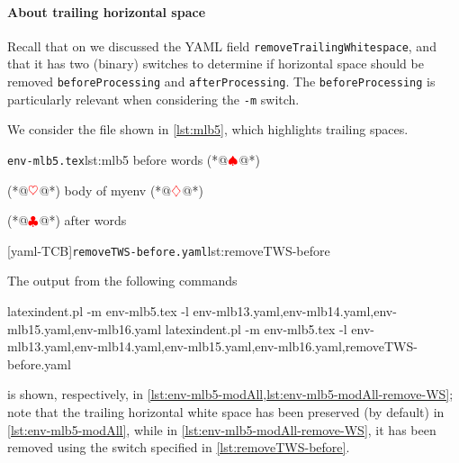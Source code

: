  \paragraph{About trailing horizontal space}
  Recall that on  we discussed the YAML field
  \texttt{removeTrailingWhitespace}, and that it has two (binary) switches to determine if
  horizontal space should be removed \texttt{beforeProcessing} and
  \texttt{afterProcessing}. The \texttt{beforeProcessing} is particularly relevant when
  considering the \texttt{-m} switch.

  \begin{example}
  We consider the file shown in \cref{lst:mlb5}, which highlights trailing spaces.

  \begin{cmhtcbraster}
   \begin{cmhlistings}[style=tcblatex,showspaces=true,escapeinside={(*@}{@*)}]{\texttt{env-mlb5.tex}}{lst:mlb5}
before words   (*@$\color{red}\spadesuit$@*) 
\begin{myenv}           (*@$\color{red}\heartsuit$@*)
body of myenv      (*@$\color{red}\diamondsuit$@*) 
\end{myenv}     (*@$\color{red}\clubsuit$@*)
after words
\end{cmhlistings}
   [yaml-TCB]{\texttt{removeTWS-before.yaml}}{lst:removeTWS-before}
  \end{cmhtcbraster}

  The output from the following commands 
  \begin{widepage}

   \begin{commandshell}
latexindent.pl -m env-mlb5.tex -l env-mlb13.yaml,env-mlb14.yaml,env-mlb15.yaml,env-mlb16.yaml
latexindent.pl -m env-mlb5.tex -l env-mlb13.yaml,env-mlb14.yaml,env-mlb15.yaml,env-mlb16.yaml,removeTWS-before.yaml
\end{commandshell}

  \end{widepage}
  is shown, respectively, in \cref{lst:env-mlb5-modAll,lst:env-mlb5-modAll-remove-WS}; note
  that the trailing horizontal white space has been preserved (by default) in
  \cref{lst:env-mlb5-modAll}, while in \cref{lst:env-mlb5-modAll-remove-WS}, it has been
  removed using the switch specified in \cref{lst:removeTWS-before}.

  \begin{widepage}

  \end{widepage}
  \end{example}

